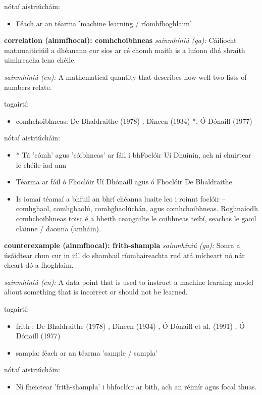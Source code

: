 \documentclass{article}
\begin{document}
nótaí aistriúcháin:
\begin{itemize}
	\item Féach ar an téarma 'machine learning / ríomhfhoghlaim'
\end{itemize}


\textbf{correlation (ainmfhocal): comhchoibhneas}
\textit{sainmhíniú (ga):} Cáilíocht matamaiticiúil a dhéanann cur síos ar cé chomh maith is a luíonn dhá shraith uimhreacha lena chéile.

\textit{sainmhíniú (en):} A mathematical quantity that describes how well two lists of numbers relate.

tagairtí:
\begin{itemize}
	\item comhchoibhneas: De Bhaldraithe (1978) \cite{de-bhaldraithe}, Dineen (1934) \cite{dineen}*, Ó Dónaill (1977) \cite{odonaill}
\end{itemize}

nótaí aistriúcháin:
\begin{itemize}
	\item * Tá 'cómh' agus 'cóibhneas' ar fáil i bhFoclóir Uí Dhuinín, ach ní chuirtear le chéile iad ann
	\item Téarma ar fáil ó Fhoclóir Uí Dhónaill agus ó Fhoclóir De Bhaldraithe.
	\item Is iomaí téamaí a bhfuil an bhrí chéanna luaite leo i roinnt foclóir -- comhghaol, comhghaolú, comhghaolúchán, agus comhchoibhneas. Roghnaíodh comhchoibhneas toisc é a bheith ceangailte le coibhneas teibí, seachas le gaoil clainne / daonna (amháin).
\end{itemize}


\textbf{counterexample (ainmfhocal): frith-shampla}
\textit{sainmhíniú (ga):} Sonra a úsáidtear chun cur in iúl do shamhail ríomhaireachta rud atá mícheart nó nár cheart dó a fhoghlaim.

\textit{sainmhíniú (en):} A data point that is used to instruct a machine learning model about something that is incorrect or should not be learned.

tagairtí:
\begin{itemize}
	\item frith-: De Bhaldraithe (1978) \cite{de-bhaldraithe}, Dineen (1934) \cite{dineen}, Ó Dónaill et al. (1991) \cite{focloir-beag}, Ó Dónaill (1977) \cite{odonaill}
	\item sampla: féach ar an téarma 'sample / sampla'
\end{itemize}

nótaí aistriúcháin:
\begin{itemize}
	\item Ní fheictear 'frith-shampla' i bhfoclóir ar bith, ach an réimír agus focal thuas.
\end{itemize}
\end{document}
